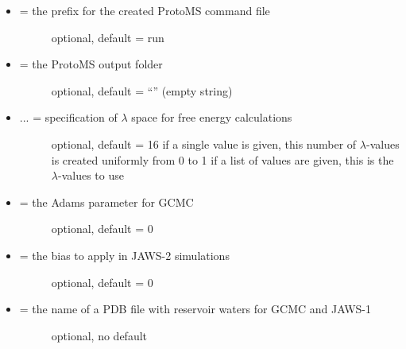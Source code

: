 \documentclass[letterpaper,10pt,english]{manual}
\begin{document}
\begin{itemize}
\item {} \begin{description}
\item[{ = the prefix for the created ProtoMS command file}] \leavevmode
optional, default = run

\end{description}

\item {} \begin{description}
\item[{ = the ProtoMS output folder}] \leavevmode
optional, default = ``'' (empty string)

\end{description}

\item {} \begin{description}
\item[{ ... = specification of $\lambda$ space for free energy calculations}] \leavevmode
optional, default = 16
if a single value is given, this number of $\lambda$-values is created uniformly from 0 to 1
if a list of values are given, this is the $\lambda$-values to use

\end{description}

\item {} \begin{description}
\item[{ = the Adams parameter for GCMC}] \leavevmode
optional, default = 0

\end{description}

\item {} \begin{description}
\item[{ = the bias to apply in JAWS-2 simulations}] \leavevmode
optional, default = 0

\end{description}

\item {} \begin{description}
\item[{ = the name of a PDB file with reservoir waters for GCMC and JAWS-1}] \leavevmode
optional, no default

\end{description}


\end{itemize}
\end{document}
